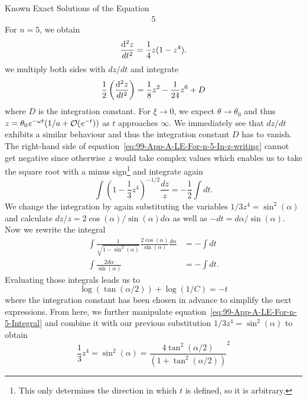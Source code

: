 \begin{subsection}{Known Exact Solutions of the \texorpdfstring{}{LE} Equation}
\begin{alignat}{5}
\end{alignat}
For $n=5$, we obtain
\begin{equation}
	\frac{\mathop{}\!\mathrm{d}^2 z}{dt^2}=\frac{1}{4}z(1-z^4).
	\label{eq:99-App-LE-Transform-N5}
\end{equation}
we multiply both sides with $dz/dt$ and integrate
\begin{equation}
	\frac{1}{2}\left(\frac{\mathop{}\!\mathrm{d}^2 z}{dt^2}\right) = \frac{1}{8}z^2-\frac{1}{24}z^6+D
	\label{eq:99-App-A-LE-For-n-5-In-z-writing}
\end{equation}
where $D$ is the integration constant.
For $\xi\rightarrow0$, we expect $\theta\rightarrow\theta_0$ and thus $z=\theta_0\mathit{e}^{-\omega t}(1/a+\mathcal{O}(\mathit{e}^{-t}))$ as $t$ approaches $\infty$.
We immediately see that $dz/dt$ exhibits a similar behaviour and thus the integration constant $D$ has to vanish.\\
The right-hand side of equation~\ref{eq:99-App-A-LE-For-n-5-In-z-writing} cannot get negative since otherwise $z$ would take complex values which enables us to take the square root with a minus sign\footnote{This only determines the direction in which $t$ is defined, so it is arbitrary.} and integrate again
\begin{equation}
	\int\left(1-\frac{1}{3}z^4\right)^{-1/2}\frac{dz}{z}=-\frac{1}{2}\int dt.
	\label{eq:99-App-LE-N5-Intermediate-Eq}
\end{equation}
We change the integration by again substituting the variables $1/3z^4=\sin^2(\alpha)$ and calculate $dz/z=2\cos(\alpha)/\sin(\alpha)d\alpha$ as well as $-dt=d\alpha/\sin(\alpha)$.
Now we rewrite the integral
\begin{align}
	\int\frac{1}{\sqrt{1-\sin^2(\alpha)}}\frac{2\cos(\alpha)}{\sin(\alpha)}\frac{d\alpha}{} &= -\int dt\\
	\int\frac{2d\alpha}{\sin(\alpha)} &= -\int dt.
\end{align}
Evaluating those integrals leads us to
\begin{equation}
	\log(\tan(\alpha/2))+\log(1/C) = -t
	\label{eq:99-App-A-LE-For-n-5-Integral}
\end{equation}
where the integration constant has been chosen in advance to simplify the next expressions.
From here, we further manipulate equation~\ref{eq:99-App-A-LE-For-n-5-Integral} and combine it with our previous substitution $1/3z^4=\sin^2(\alpha)$ to obtain
\begin{equation}
	\frac{1}{3}z^4=\sin^2(\alpha)=\frac{4\tan^2(\alpha/2)}{\left(1+\tan^2(\alpha/2)\right)}^2
	\label{eq:99-App-LE-N5-Intermediate-Eq2}

\end{equation}
\end{subsection}
